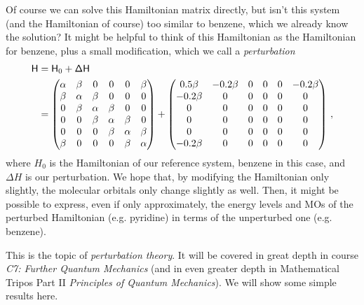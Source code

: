 \documentclass{article}
\theoremstyle{plain}\theoremheaderfont{\normalfont\itshape}\theorembodyfont{\rmfamily}\theoremseparator{.}\newtheorem*{rem}{Remark}\newtheorem*{ex}{Example}\newtheorem*{proof}{Proof}\newtheorem*{altp}{Alternative proof}
\theoremstyle{plain}\theoremheaderfont{\normalfont\bfseries}\theorembodyfont{\rmfamily}\theoremseparator{.}\newtheorem{thm}{Theorem}[section]\newtheorem{lem}[thm]{Lemma}\newtheorem{prop}[thm]{Proposition}\newtheorem*{cor}{Corollary}\newtheorem{defn}[thm]{Definition}\newtheorem{clm}[thm]{Claim}\newtheorem{clminproof}{Claim}\newtheorem{pos}{Postulate}[section]
\theoremstyle{break}\theoremheaderfont{\normalfont\itshape}\theorembodyfont{\rmfamily}\theoremseparator{.\medskip}\newtheorem*{proofskip}{Proof}\newtheorem*{exs}{Examples}\newtheorem*{rems}{Remarks}
\theoremstyle{break}\theoremheaderfont{\normalfont\bfseries}\theorembodyfont{\rmfamily}\theoremseparator{.\medskip}\newtheorem{lemskip}[thm]{Lemma}\newtheorem{defnskip}[thm]{Definition}\newtheorem{propskip}[thm]{Proposition}\newtheorem{thmskip}[thm]{Theorem}
\numberwithin{equation}{section}
\begin{document}
    Of course we can solve this Hamiltonian matrix directly, but isn't this system (and the Hamiltonian of course) too similar to benzene, which we already know the solution? It might be helpful to think of this Hamiltonian as the Hamiltonian for benzene, plus a small modification, which we call a \textit{perturbation}
    \begin{align}
        \mathsf{H}&=\mathsf{H}_0+\mathsf{\Delta H}\notag\\
        &=\begin{pmatrix}
            \alpha & \beta & 0 & 0 & 0 & \beta \\
            \beta & \alpha & \beta & 0 & 0 & 0 \\
            0 & \beta & \alpha & \beta & 0 & 0 \\
            0 & 0 & \beta & \alpha & \beta & 0 \\
            0 & 0 & 0 & \beta & \alpha & \beta \\
            \beta & 0 & 0 & 0 & \beta & \alpha
        \end{pmatrix} + \begin{pmatrix}
            0.5 \beta & -0.2\beta & 0 & 0 & 0 & -0.2\beta \\
            -0.2\beta & 0 & 0 & 0 & 0 & 0 \\
            0 & 0 & 0 & 0 & 0 & 0 \\
            0 & 0 & 0 & 0 & 0 & 0 \\
            0 & 0 & 0 & 0 & 0 & 0 \\
            -0.2\beta & 0 & 0 & 0 & 0 & 0 \\
        \end{pmatrix}\,,
    \end{align}
    where \(H_0\) is the Hamiltonian of our reference system, benzene in this case, and \(\Delta H\) is our perturbation. We hope that, by modifying the Hamiltonian only slightly, the molecular orbitals only change slightly as well. Then, it might be possible to express, even if only approximately, the energy levels and MOs of the perturbed Hamiltonian (e.g. pyridine) in terms of the unperturbed one (e.g. benzene).

    This is the topic of \textit{perturbation theory}. It will be covered in great depth in course \textit{C7: Further Quantum Mechanics} (and in even greater depth in Mathematical Tripos Part II \textit{Principles of Quantum Mechanics}). We will show some simple results here.
\end{document}
